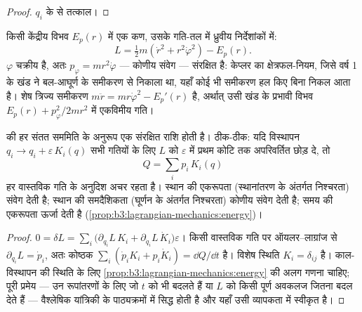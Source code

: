 \begin{proof}
$q_i$ के  से तत्काल।
\end{proof}

\begin{example}[केंद्रीय बल, देखते ही हल]\label{ex:b3:lagrangian-mechanics:central}
किसी केंद्रीय विभव $E_p(r)$ में एक कण, उसके गति-तल में ध्रुवीय
निर्देशांकों में:
\[
L = \tfrac12 m(\dot r^2 + r^2\dot\varphi^2) - E_p(r) .
\]
$\varphi$ चक्रीय है, अतः $p_\varphi = mr^2\dot\varphi$ --- कोणीय संवेग
--- संरक्षित है: केप्लर का क्षेत्रफल-नियम, जिसे वर्ष 1 के खंड ने
बल-आघूर्ण के समीकरण से निकाला था, यहाँ कोई भी समीकरण हल किए बिना निकल
आता है। शेष त्रिज्य समीकरण
$m\ddot r = mr\dot\varphi^2 - E_p'(r)$ है, अर्थात् उसी खंड के प्रभावी
विभव $E_p(r) + p_\varphi^2/2mr^2$ में एकविमीय गति।
\end{example}

\begin{theorem}[नोएटर की प्रमेय]\label{thm:b3:lagrangian-mechanics:noether}
 की हर संतत सममिति के अनुरूप एक संरक्षित राशि
होती है। ठीक-ठीक: यदि विस्थापन $q_i \to q_i + \varepsilon\,K_i(q)$
सभी गतियों के लिए $L$ को $\varepsilon$ में प्रथम कोटि तक अपरिवर्तित
छोड़ दे, तो
\[
Q = \sum_i p_i\,K_i(q)
\]
हर वास्तविक गति के अनुदिश अचर रहता है। स्थान की एकरूपता (स्थानांतरण के
अंतर्गत निश्चरता) संवेग देती है; स्थान की समदैशिकता (घूर्णन के अंतर्गत
निश्चरता) कोणीय संवेग देती है; समय की एकरूपता ऊर्जा देती है
(\cref{prop:b3:lagrangian-mechanics:energy})।
\end{theorem}

\begin{proof}
$0 = \delta L = \sum_i\big(\partial_{q_i}L\,K_i +
\partial_{\dot q_i}L\,\dot K_i\big)\varepsilon$। किसी वास्तविक गति पर
ऑयलर--लाग्रांज से $\partial_{q_i}L = \dot p_i$, अतः कोष्ठक
$\sum_i(\dot p_iK_i + p_i\dot K_i) = \dd Q/\dd t$ है। 
विशेष स्थिति $K_i = \delta_{ij}$ है। काल-विस्थापन की स्थिति के लिए
\cref{prop:b3:lagrangian-mechanics:energy} की अलग गणना चाहिए; पूरी
प्रमेय --- उन रूपांतरणों के लिए जो $t$ को भी बदलते हैं या $L$ को किसी
पूर्ण अवकलज जितना बदल देते हैं --- वैश्लेषिक यांत्रिकी के पाठ्यक्रमों
में सिद्ध होती है और यहाँ उसी व्यापकता में स्वीकृत है।
\end{proof}


